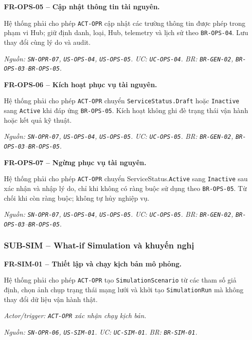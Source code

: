 \medskip
\noindent\textbf{FR-OPS-05 -- Cập nhật thông tin tài nguyên.}\par
\nopagebreak[4]
Hệ thống phải cho phép \texttt{ACT-OPR} cập nhật các trường thông tin được phép trong phạm vi Hub; giữ định danh, loại, Hub, telemetry và lịch sử theo \texttt{BR-OPS-04}. Lưu thay đổi cùng lý do và audit.

\textit{Nguồn: \texttt{SN-OPR-07}, \texttt{US-OPS-04}, \texttt{US-OPS-05}. UC: \texttt{UC-OPS-04}. BR: \texttt{BR-GEN-02}, \texttt{BR-OPS-03}--\texttt{BR-OPS-05}.}

\medskip
\noindent\textbf{FR-OPS-06 -- Kích hoạt phục vụ tài nguyên.}\par
\nopagebreak[4]
Hệ thống phải cho phép \texttt{ACT-OPR} chuyển \texttt{ServiceStatus.Draft} hoặc \texttt{Inactive} sang \texttt{Active} khi đáp ứng \texttt{BR-OPS-05}. Kích hoạt không ghi đè trạng thái vận hành hoặc kết quả kỹ thuật.

\textit{Nguồn: \texttt{SN-OPR-07}, \texttt{US-OPS-04}, \texttt{US-OPS-05}. UC: \texttt{UC-OPS-05}. BR: \texttt{BR-GEN-02}, \texttt{BR-OPS-03}--\texttt{BR-OPS-05}.}

\medskip
\noindent\textbf{FR-OPS-07 -- Ngừng phục vụ tài nguyên.}\par
\nopagebreak[4]
Hệ thống phải cho phép \texttt{ACT-OPR} chuyển ServiceStatus.\texttt{Active} sang \texttt{Inactive} sau xác nhận và nhập lý do, chỉ khi không có ràng buộc sử dụng theo \texttt{BR-OPS-05}. Từ chối khi còn ràng buộc; không tự hủy nghiệp vụ.

\textit{Nguồn: \texttt{SN-OPR-07}, \texttt{US-OPS-04}, \texttt{US-OPS-05}. UC: \texttt{UC-OPS-05}. BR: \texttt{BR-GEN-02}, \texttt{BR-OPS-03}--\texttt{BR-OPS-05}.}

\subsubsection{SUB-SIM -- What-if Simulation và khuyến nghị}

\noindent\textbf{FR-SIM-01 -- Thiết lập và chạy kịch bản mô phỏng.}\par
\nopagebreak[4]
Hệ thống phải cho phép \texttt{ACT-OPR} tạo \texttt{SimulationScenario} từ các tham số giả định, chọn ảnh chụp trạng thái mạng lưới và khởi tạo \texttt{SimulationRun} mà không thay đổi dữ liệu vận hành thật.

\textit{Actor/trigger: \texttt{ACT-OPR} xác nhận chạy kịch bản.}\par
\textit{Nguồn: \texttt{SN-OPR-06}, \texttt{US-SIM-01}. UC: \texttt{UC-SIM-01}. BR: \texttt{BR-SIM-01}.}

